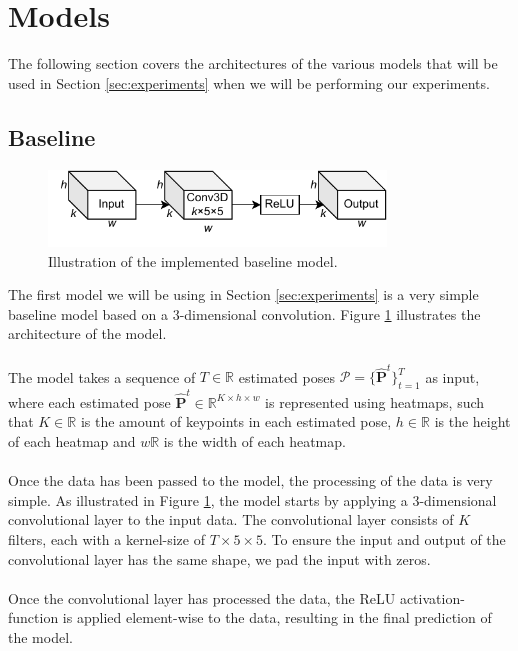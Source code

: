 \documentclass[./main.tex]{subfiles}
\begin{document}
\section{Models}
The following section covers the architectures of the various models that will be used in Section \ref{sec:experiments} when we will be performing our experiments. 

\subsection{Baseline}
\begin{figure}[htbp]
    \centering
    \includegraphics[width=0.8\textwidth]{./entities/baseline.pdf}
    \caption{Illustration of the implemented baseline model.}
    \label{fig:baseline}
\end{figure}

\noindent The first model we will be using in Section \ref{sec:experiments} is a very simple baseline model based on a 3-dimensional convolution. Figure \ref{fig:baseline} illustrates the architecture of the model.
\\
\\
The model takes a sequence of $T \in \mathbb{R}$ estimated poses $\hat{\mathcal{P}} = \{\hat{\bm{P}}^t\}_{t = 1} ^T$ as input, where each estimated pose $\hat{\bm{P}}^t \in \mathbb{R}^{K \times h \times w}$ is represented using heatmaps, such that $K \in \mathbb{R}$ is the amount of keypoints in each estimated pose, $h \in \mathbb{R}$ is the height of each heatmap and $w \mathbb{R}$ is the width of each heatmap.
\\
\\
Once the data has been passed to the model, the processing of the data is very simple. As illustrated in Figure \ref{fig:baseline}, the model starts by applying a 3-dimensional convolutional layer to the input data. The convolutional layer consists of $K$ filters, each with a kernel-size of $T \times 5 \times 5$. To ensure the input and output of the convolutional layer has the same shape, we pad the input with zeros.
\\
\\
Once the convolutional layer has processed the data, the ReLU activation-function is applied element-wise to the data, resulting in the final prediction of the model.
\end{document}
